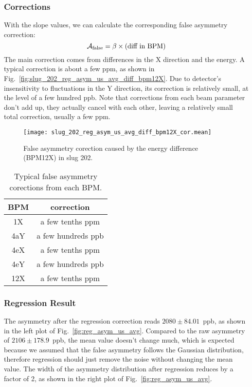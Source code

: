 \subsubsection{Corrections}
With the slope values, we can calculate the corresponding false asymmetry correction:
\begin{equation}
    \mathcal{A}_{\text{false}} = \beta \times \text{(diff in BPM)}
\end{equation}
The main correction comes from differences in the X direction and the energy.
A typical correction is about a few ppm, as shown in Fig.~\ref{fig:slug_202_reg_asym_us_avg_diff_bpm12X}.
Due to detector's insensitivity to fluctuations in the Y direction, its correction 
is relatively small, at the level of  a few hundred ppb. Note that corrections
from each beam parameter don't add up, they actually cancel with each other,
leaving a relatively small total correction, usually a few ppm.

\begin{figure}[H]
    \centering
    \texttt{[image: slug\_202\_reg\_asym\_us\_avg\_diff\_bpm12X\_cor.mean]}
    \caption{False asymmetry corection caused by the energy difference (BPM12X) in
    slug 202.}
    \label{fig:slug_202_reg_asym_us_avg_diff_bpm12X_cor}
\end{figure}

\begin{table}[!h]
    \centering
    \begin{tabular}{c | c}
	\hline
	BPM  & correction   \\
	\hline
	1X  & a few tenths ppm \\
	4aY & a few hundreds ppb     \\
	4eX & a few tenths ppm \\
	4eY & a few hundreds ppb     \\
	12X  & a few tenths ppm \\
	\hline
    \end{tabular}
    \caption{Typical false asymmetry corections from each BPM.}
\end{table}

\subsubsection{Regression Result}
The asymmetry after the regression correction reads $2080 \pm 84.01$~ppb, as shown 
in the left plot of Fig.~\ref{fig:reg_asym_us_avg}. Compared to the raw asymmetry
of $2106 \pm 178.9$~ppb,
the mean value doesn't change much, which is expected because we assumed
that the false asymmetry follows the Gaussian distribution, therefore
regression should just remove the noise without changing the mean value.
The width of the asymmetry distribution after regression
reduces by a factor of 2, as shown in the right plot of Fig.~\ref{fig:reg_asym_us_avg}.

